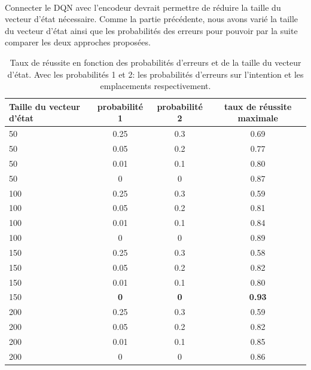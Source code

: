 \paragraph{} Connecter le DQN avec l'encodeur devrait permettre de réduire la taille du vecteur d'état nécessaire. Comme la partie précédente, nous avons varié la taille du vecteur d'état ainsi que les probabilités des erreurs pour pouvoir par la suite comparer les deux approches proposées. 
\begin{table}[H]
	\begin{center}
		
		\begin{tabular}{|l|c|c|c|}
			\hline
			\textbf{Taille du vecteur d'état} & \textbf{probabilité 1} & \textbf{probabilité 2} & \textbf{taux de réussite maximale}\\
			\hline
			50 & 0.25 & 0.3 & 0.69\\
			\hline
			50 & 0.05 & 0.2 & 0.77\\
			\hline
			50 & 0.01 & 0.1 & 0.80\\
			\hline
			50 & 0 & 0 & 0.87\\
			\hline
			100 & 0.25 & 0.3 & 0.59\\
			\hline
			100 & 0.05 & 0.2 & 0.81\\
			\hline
			100 & 0.01 & 0.1 & 0.84\\
			\hline
			100 & 0 & 0 & 0.89\\
			\hline
			150 & 0.25 & 0.3 & 0.58\\
			\hline
			150 & 0.05 & 0.2 & 0.82\\
			\hline
			150 & 0.01 & 0.1 & 0.80\\
			\hline
			150 & \textbf{0} & \textbf{0} & \textbf{0.93}\\
			\hline
			200 & 0.25 & 0.3 & 0.59\\
			\hline
			200 & 0.05 & 0.2 & 0.82\\
			\hline
			\rowcolor{LightCyan}
			200 & 0.01 & 0.1 & 0.85\\
			\hline
			200 & 0 & 0 & 0.86\\
			\hline
		\end{tabular}
		\caption{Taux de réussite en fonction des probabilités d'erreurs et de la taille du vecteur d'état. Avec les probabilités 1 et 2: les probabilités d'erreurs sur l'intention et les emplacements respectivement.}\label{table_results_con}
	\end{center}
\end{table}
